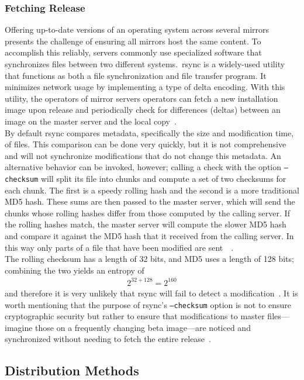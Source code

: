 \documentclass[conference]{IEEEtran}
\begin{document}
\subsubsection{Fetching Release}
Offering up-to-date versions of an operating system across several
mirrors presents the challenge of ensuring all mirrors host the same content.
To accomplish this reliably, servers commonly use specialized software that
synchronizes files between two different systems.\
rsync is a widely-used utility that functions as both a file synchronization
and file transfer program. It minimizes network usage by implementing a
type of delta encoding. With this utility, the operators of mirror
servers operators can fetch a new installation image upon release and periodically
check for differences (deltas) between an image on the master server and
the local copy~\cite{ubuntursync}.\\
\indent By default rsync compares metadata, specifically the size and modification time, of files. This comparison can be done very quickly,
but it is not comprehensive and will not synchronize modifications that
do not change this metadata. An alternative behavior can be invoked,
however; calling a check with the option \texttt{--checksum} will split
its file into chunks and compute a set of two checksums for each chunk.
The first is a speedy rolling hash and the second is a more traditional
MD5 hash. These sums are then passed to the master server,
which will send the chunks whose rolling hashes differ from
those computed by the calling server. If the rolling hashes match,
the master server will compute the slower MD5 hash and compare it against
the MD5 hash that it received from the calling server. In this way
only parts of a file that have been modified are sent~\cite{ubuntuzsync}~\cite{sambarsync}.\\
\indent The rolling checksum has a length of 32 bits, and MD5 uses a
length of 128 bits; combining the two yields an entropy of
\begin{align*}
2^{32+128}=2^{160}
\end{align*}
and therefore it is very unlikely that rsync will fail to detect 
a modification~\cite{rsyncmath}. It is worth mentioning that the purpose of rsync's
\texttt{--checksum} option is not to ensure cryptographic security but
rather to ensure that modifications to master files---imagine those on a
frequently changing beta image---are noticed and synchronized without
needing to fetch the entire release~\cite{ubuntuzsync}.

\subsection{Distribution Methods}
\end{document}
